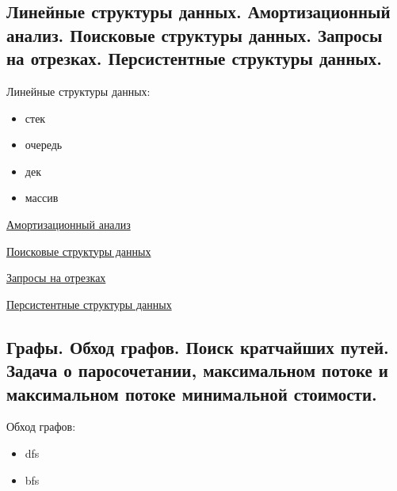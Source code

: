 \documentclass{article}
\begin{document}
\subsection{Линейные структуры данных. Амортизационный анализ. Поисковые структуры данных. Запросы на отрезках. Персистентные структуры данных.}

Линейные структуры данных:
\begin{itemize}
    \item стек
    \item очередь
    \item дек
    \item массив
\end{itemize}

\href{https://neerc.ifmo.ru/wiki/index.php?title=%D0%90%D0%BC%D0%BE%D1%80%D1%82%D0%B8%D0%B7%D0%B0%D1%86%D0%B8%D0%BE%D0%BD%D0%BD%D1%8B%D0%B9_%D0%B0%D0%BD%D0%B0%D0%BB%D0%B8%D0%B7}{Амортизационный анализ}

\href{https://neerc.ifmo.ru/wiki/index.php?title=%D0%9F%D0%BE%D0%B8%D1%81%D0%BA%D0%BE%D0%B2%D1%8B%D0%B5_%D1%81%D1%82%D1%80%D1%83%D0%BA%D1%82%D1%83%D1%80%D1%8B_%D0%B4%D0%B0%D0%BD%D0%BD%D1%8B%D1%85}{Поисковые структуры данных}

\href{https://e-maxx.ru/algo/segment_tree}{Запросы на отрезках}

\href{https://neerc.ifmo.ru/wiki/index.php?title=%D0%9F%D0%B5%D1%80%D1%81%D0%B8%D1%81%D1%82%D0%B5%D0%BD%D1%82%D0%BD%D1%8B%D0%B5_%D1%81%D1%82%D1%80%D1%83%D0%BA%D1%82%D1%83%D1%80%D1%8B_%D0%B4%D0%B0%D0%BD%D0%BD%D1%8B%D1%85}{Персистентные структуры данных}


\subsection{Графы. Обход графов. Поиск кратчайших путей. Задача о паросочетании, максимальном потоке и максимальном потоке минимальной стоимости.}

Обход графов:
\begin{itemize}
    \item dfs
    \item bfs
\end{itemize}
\end{document}
